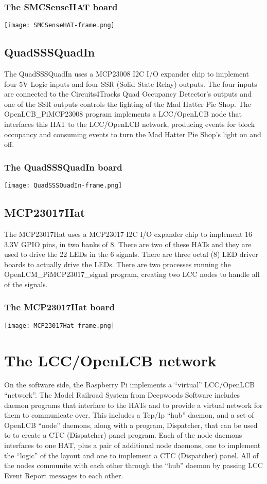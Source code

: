 \documentclass[letterpaper]{article} \usepackage{beamerarticle}
\begin{document}
\begin{frame}
    \frametitle{The SMCSenseHAT board}
    \texttt{[image: SMCSenseHAT-frame.png]}
\end{frame}

\subsection{QuadSSSQuadIn}

The QuadSSSQuadIn uses a MCP23008 I2C I/O expander chip to implement four 5V 
Logic inputs and four SSR (Solid State Relay) outputs.  The four inputs are 
connected to the Circuits4Tracks Quad Occupancy Detector's outputs and one of 
the SSR outputs controls the lighting of the Mad Hatter Pie Shop.  The 
OpenLCB\_PiMCP23008 program implements a LCC/OpenLCB node that interfaces this 
HAT to the LCC/OpenLCB network, producing events for block occupancy and 
consuming events to turn the Mad Hatter Pie Shop's light on and off.

\begin{frame}
    \frametitle{The QuadSSSQuadIn board}
    \texttt{[image: QuadSSSQuadIn-frame.png]}
\end{frame}


\subsection{MCP23017Hat}

The MCP23017Hat uses a MCP23017 I2C I/O expander chip to implement 16 3.3V 
GPIO pins, in two banks of 8.  There are two of these HATs and they are used 
to drive the 22 LEDs in the 6 signals.  There are three octal (8) LED driver 
boards to actually drive the LEDs.  There are two processes running the 
OpenLCM\_PiMCP23017\_signal program, creating two LCC nodes to handle all of 
the signals.

\begin{frame}
   \frametitle{The MCP23017Hat board}
   \texttt{[image: MCP23017Hat-frame.png]}
\end{frame}

\section{The LCC/OpenLCB network}

On the software side, the Raspberry Pi implements a ``virtual'' LCC/OpenLCB
``network''. The Model Railroad System from Deepwoods Software includes daemon
programs that interface to the HATs and to provide a virtual network for them
to communicate over. This includes a Tcp/Ip ``hub'' daemon, and a set of
OpenLCB ``node'' daemons, along with a program, Dispatcher, that can be used
to to create a CTC (Dispatcher) panel program. Each of the node daemons
interfaces to one HAT, plus a pair of additional node daemons, one to
implement the ``logic'' of the layout and one to implement a CTC (Dispatcher)
panel. All of the nodes communite with each other through the ``hub'' daemon
by passing LCC Event Report messages to each other. 
\end{document}
